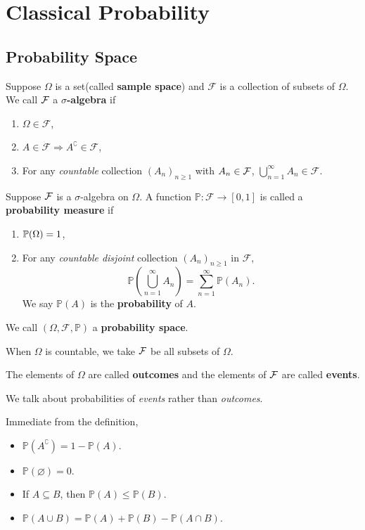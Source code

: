 \section{Classical Probability}
\subsection{Probability Space}
\begin{definition}
    Suppose $ \Omega $ is a set(called \textbf{sample space}) and $ \mathcal{F} $ is a collection of subsets of $ \Omega $. We call ${\mathcal{F}}$ a \textbf{$\sigma$-algebra} if 
    \begin{enumerate}
        \item $ \Omega\in \mathcal{F} $,
        \item $ A\in \mathcal{F} \Rightarrow A^\complement \in \mathcal{F} $,
        \item For any \textit{countable} collection $ (A_n)_{n\ge 1} $ with $A_n\in {\mathcal{F}}$, $ \bigcup_{n=1}^{\infty}A_n\in \mathcal{F} $.
    \end{enumerate}
    Suppose ${\mathcal{F}}$ is a $ \sigma $-algebra on $ \Omega $. A function $ \mathbb{P}:\mathcal{F}\to [0,1] $ is called a \textbf{probability measure} if
    \begin{enumerate}
        \item $ {\mathbb{P}}(\Omega)=1 $,
        \item For any \textit{countable disjoint} collection $ (A_n)_{n\ge 1} $ in $ \mathcal{F} $, 
        \[
            \mathbb{P}\left( \bigcup_{n=1}^{\infty}A_n \right) = \sum_{n=1}^{\infty} \mathbb{P}(A_n).
        \]
        We say $ \mathbb{P}(A) $ is the \textbf{probability} of $A$.
    \end{enumerate}
    We call $ (\Omega,\mathcal{F},\mathbb{P}) $ a \textbf{probability space}.
\end{definition}
\begin{remark}
    When $ \Omega $ is countable, we take ${\mathcal{F}}$ be all subsets of $ \Omega $.
\end{remark}
\begin{definition}
    The elements of $ \Omega $ are called \textbf{outcomes} and the elements of ${\mathcal{F}}$ are called \textbf{events}.
\end{definition}
\begin{remark}
    We talk about probabilities of \textit{events} rather than \textit{outcomes}.
\end{remark}
\begin{proposition}\label{prop:Properties of P}
    Immediate from the definition,
    \begin{itemize}
        \item $ \mathbb{P}(A^\complement) = 1 - \mathbb{P}(A) $.
        \item $ \mathbb{P}(\varnothing)=0 $.
        \item If $ A \subseteq B $, then $ \mathbb{P}(A) \le \mathbb{P}(B) $.
        \item $ \mathbb{P}(A \cup B) = \mathbb{P}(A)+\mathbb{P}(B)-\mathbb{P}(A \cap B) $.
    \end{itemize}
\end{proposition}
